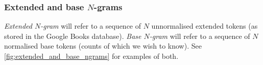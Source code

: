 \documentclass[draft]{IIBproject}
\begin{document}
\subsubsection{Extended and base $N$-grams}

\emph{Extended $N$-gram} will refer to a sequence of $N$ unnormalised extended tokens (as stored in the Google Books database). \emph{Base $N$-gram} will refer to a sequence of $N$ normalised base tokens (counts of which we wish to know). See \cref{fig:extended_and_base_ngrams} for examples of both.

%
\newcommand{\ngramMark}[3] {
	\draw [very thick] (#1,#3)--(#2,#3);
}

%
\newcommand{\extendedTokenDelimiter}[1] {
	\draw (#1,-19)--(#1,14.5);
}

%
\newcommand{\baseTokenDelimiter}[1] {
	\draw [dotted] (#1,-19)--(#1,14.5);
}

%
\newcommand{\ngramsLabel}[3] {
	\draw [decorate,decoration={brace,amplitude=2.5pt,raise=2.5pt}] (-1,#1) -- (-1,#2) node [midway,left,xshift=-5pt] {#3};
}
\end{document}
